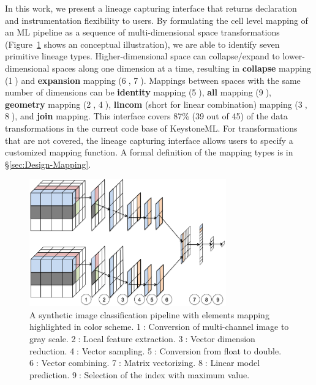\documentclass{sig-alternate}
\begin{document}
In this work, we present a lineage capturing interface that returns declaration and instrumentation flexibility to users. 
By formulating the cell level mapping of an ML pipeline as a sequence of multi-dimensional space transformations
(Figure~\ref{fig:conceptual} shows an conceptual illustration), we are able to identify seven primitive lineage types.
Higher-dimensional space can collapse/expand to lower-dimensional spaces along one dimension at a time, 
resulting in {\bf collapse} mapping (\textcircled{1}) and {\bf expansion} mapping (\textcircled{6}, \textcircled{7}). 
Mappings between spaces with the same number of dimensions can be {\bf identity} mapping (\textcircled{5}), {\bf all} mapping (\textcircled{9}), 
{\bf geometry} mapping (\textcircled{2}, \textcircled{4}), {\bf lincom} (short for linear combination) mapping (\textcircled{3}, \textcircled{8}),
and {\bf join} mapping. 
This interface covers 87\% (39 out of 45) of the data transformations in the current code base of KeystoneML. 
For transformations that are not covered, the lineage capturing interface allows users to specify a customized mapping function.
A formal definition of the mapping types is in \S\ref{sec:Design-Mapping}.

\begin{figure}[t]
\begin{center}
    \includegraphics[width=85mm]{pictures/Conceptual}
    \caption {A synthetic image classification pipeline with elements mapping highlighted in color scheme. 
    \textcircled{1}: Conversion of multi-channel image to gray scale.
    \textcircled{2}: Local feature extraction.
    \textcircled{3}: Vector dimension reduction.
    \textcircled{4}: Vector sampling.
    \textcircled{5}: Conversion from float to double.
    \textcircled{6}: Vector combining.
    \textcircled{7}: Matrix vectorizing.
    \textcircled{8}: Linear model prediction.
    \textcircled{9}: Selection of the index with maximum value.
    \label{fig:conceptual}
}
\end{center}
\end{figure}
\end{document}
